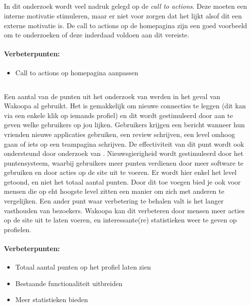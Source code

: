 \documentclass[a4paper, 10pt, pdftex]{report}
\begin{document}
 \subsection{\cite{Beenen2004}}
      In dit onderzoek wordt veel nadruk gelegd op de \emph{call to actions}. Deze moeten een interne motivatie stimuleren, maar er niet voor zorgen dat het lijkt alsof dit een externe motivatie is. De call to actions op de homepagina zijn een goed voorbeeld om te onderzoeken of deze inderdaad voldoen aan dit vereiste.

      \paragraph{\textbf{Verbeterpunten:}}
      \begin{itemize}
        \item Call to actions op homepagina aanpassen
      \end{itemize}

    \subsection{\cite{Berlanga2007}}
    Een aantal van de punten uit het onderzoek van \citeauthor{Berlanga2007} werden in het geval van Wakoopa al gebruikt. Het is gemakkelijk om nieuwe connecties te leggen (dit kan via een enkele klik op iemands profiel) en dit wordt gestimuleerd door aan te geven welke gebruikers op jou lijken. Gebruikers krijgen een bericht wanneer hun vrienden nieuwe applicaties gebruiken, een review schrijven, een level omhoog gaan of iets op een teampagina schrijven. De effectiviteit van dit punt wordt ook ondersteund door onderzoek van \cite{Berlanga2007}. Nieuwsgierigheid wordt gestimuleerd door het puntensysteem, waarbij gebruikers meer punten verdienen door meer software te gebruiken en door acties op de site uit te voeren. Er wordt hier enkel het level getoond, en niet het totaal aantal punten. Door dit toe voegen bied je ook voor mensen die op eht hoogste level zitten een manier om zich met anderen te vergelijken. Een ander punt waar verbetering te behalen valt is het langer vasthouden van bezoekers. Wakoopa kan dit verbeteren door mensen meer acties op de site uit te laten voeren, en interessante(re) statistieken weer te geven op profielen.

      \paragraph{\textbf{Verbeterpunten:}}
      \begin{itemize}
        \item Totaal aantal punten op het profiel laten zien
        \item Bestaande functionaliteit uitbreiden
        \item Meer statistieken bieden
      \end{itemize}
\end{document}
